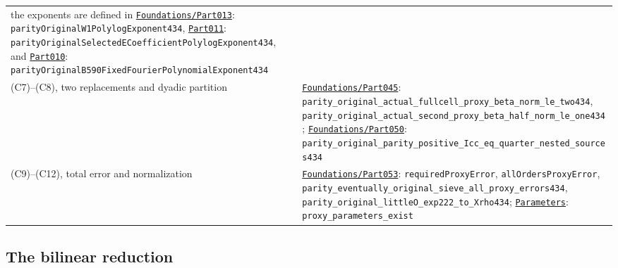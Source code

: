 \begin{longtable}[]{@{}
  >{\raggedright\arraybackslash}p{}
  >{\raggedright\arraybackslash}p{}@{}}
the exponents are defined in
\href{../Green64/Library/Sieve/Foundations/Part013.lean}{\nolinkurl{Foundations/Part013}}:
{\small\nolinkurl{parityOriginalW1PolylogExponent434}},
\href{../Green64/Library/Sieve/Foundations/Part011.lean}{\nolinkurl{Part011}}:
{\small\nolinkurl{parityOriginalSelectedECoefficientPolylogExponent434}},
and
\href{../Green64/Library/Sieve/Foundations/Part010.lean}{\nolinkurl{Part010}}:
{\small\nolinkurl{parityOriginalB590FixedFourierPolynomialExponent434}} \\
(C7)--(C8), two replacements and dyadic partition &
\href{../Green64/Library/Sieve/Foundations/Part045.lean}{\nolinkurl{Foundations/Part045}}:
{\small\nolinkurl{parity_original_actual_fullcell_proxy_beta_norm_le_two434}},
{\small\nolinkurl{parity_original_actual_second_proxy_beta_half_norm_le_one434}};
\href{../Green64/Library/Sieve/Foundations/Part050.lean}{\nolinkurl{Foundations/Part050}}:
{\small\nolinkurl{parity_original_parity_positive_Icc_eq_quarter_nested_sources434}} \\
(C9)--(C12), total error and normalization &
\href{../Green64/Library/Sieve/Foundations/Part053.lean}{\nolinkurl{Foundations/Part053}}:
{\small\nolinkurl{requiredProxyError}},
{\small\nolinkurl{allOrdersProxyError}},
{\small\nolinkurl{parity_eventually_original_sieve_all_proxy_errors434}},
{\small\nolinkurl{parity_original_littleO_exp222_to_Xrho434}};
\href{../Green64/Sieve/Parameters.lean}{\nolinkurl{Parameters}}:
{\small\nolinkurl{proxy_parameters_exist}} \\
\end{longtable}


\hypertarget{bilinear-source-correspondence}{%
\subsection{The bilinear
reduction}\label{bilinear-source-correspondence}}

